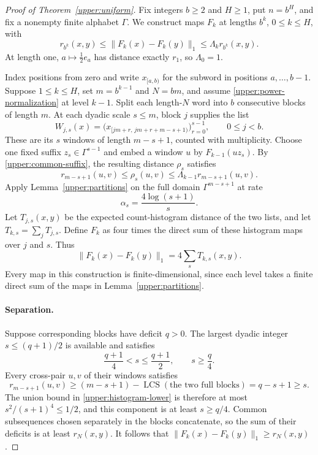 \begin{proof}[Proof of Theorem~\ref{upper:uniform}]
Fix integers $b\ge2$ and $H\ge1$, put $n=b^H$, and fix a nonempty finite
alphabet $\Gamma$.  We construct maps $F_k$ at lengths $b^k$, $0\le k\le H$,
with
\begin{equation}\label{upper:power-normalization}
 r_{b^k}(x,y)\le\|F_k(x)-F_k(y)\|_1
             \le\Lambda_k r_{b^k}(x,y).
\end{equation}
At length one, $a\mapsto\tfrac12e_a$ has distance exactly $r_1$, so
$\Lambda_0=1$.

Index positions from zero and write $x_{[a,b)}$ for the subword in
positions $a,\ldots,b-1$.  Suppose $1\le k\le H$, set
$m=b^{k-1}$ and $N=bm$, and assume \eqref{upper:power-normalization}
at level $k-1$.  Split each length-$N$ word into $b$ consecutive blocks
of length $m$.  At each dyadic scale $s\le m$, block $j$ supplies the
list
\[
 W_{j,s}(x)=
 \bigl(x_{[jm+r,\,jm+r+m-s+1)}\bigr)_{r=0}^{s-1},
 \qquad 0\le j<b.
\]
These are its $s$ windows of length $m-s+1$, counted with multiplicity.
Choose one fixed suffix $z_s\in\Gamma^{s-1}$ and embed a window $u$
by $F_{k-1}(uz_s)$.  By \eqref{upper:common-suffix}, the resulting
distance $\rho_s$ satisfies
\[
 r_{m-s+1}(u,v)\le\rho_s(u,v)
       \le\Lambda_{k-1}r_{m-s+1}(u,v).
\]
Apply Lemma~\ref{upper:partitions} on the full domain
$\Gamma^{m-s+1}$ at rate
\begin{equation}\label{upper:lambda-local}
 \alpha_s=\frac{4\log(s+1)}s.
\end{equation}
Let $T_{j,s}(x,y)$ be the expected count-histogram distance of the two
lists, and let $T_{k,s}=\sum_jT_{j,s}$.  Define $F_k$ as four times the
direct sum of these histogram maps over $j$ and $s$.  Thus
\[
 \|F_k(x)-F_k(y)\|_1=4\sum_sT_{k,s}(x,y).
\]
Every map in this construction is finite-dimensional, since each level
takes a finite direct sum of the maps in Lemma~\ref{upper:partitions}.

\paragraph{Separation.}
Suppose corresponding blocks have deficit $q>0$.  The largest dyadic
integer $s\le(q+1)/2$ is available and satisfies
\begin{equation}\label{upper:power-scale}
 \frac{q+1}{4}<s\le\frac{q+1}{2},\qquad s\ge\frac q4.
\end{equation}
Every cross-pair $u,v$ of their windows satisfies
\[
 r_{m-s+1}(u,v)
 \ge(m-s+1)-\operatorname{LCS}(\text{the two full blocks})
 =q-s+1\ge s.
\]
The union bound in \eqref{upper:histogram-lower} is therefore at most
$s^2/(s+1)^4\le1/2$, and this component is at least $s\ge q/4$.
Common subsequences chosen separately in the blocks concatenate, so the
sum of their deficits is at least $r_N(x,y)$.  It follows that
$\|F_k(x)-F_k(y)\|_1\ge r_N(x,y)$.


\end{proof}
